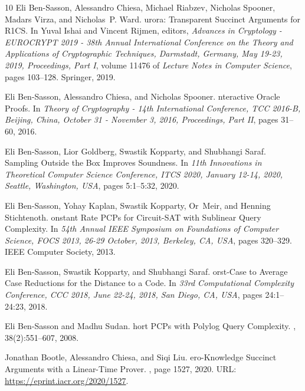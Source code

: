 \begin{thebibliography}{10}
Eli Ben{-}Sasson, Alessandro Chiesa, Michael Riabzev, Nicholas Spooner, Madars
  Virza, and Nicholas~P. Ward.
urora: {T}ransparent {S}uccinct {A}rguments for {{R}1{C}{S}}.
\newblock In Yuval Ishai and Vincent Rijmen, editors, {\em Advances in
  Cryptology - {EUROCRYPT} 2019 - 38th Annual International Conference on the
  Theory and Applications of Cryptographic Techniques, Darmstadt, Germany, May
  19-23, 2019, Proceedings, Part {I}}, volume 11476 of {\em Lecture Notes in
  Computer Science}, pages 103--128. Springer, 2019.

Eli Ben{-}Sasson, Alessandro Chiesa, and Nicholas Spooner.
nteractive {O}racle {P}roofs.
\newblock In {\em Theory of Cryptography - 14th International Conference, {TCC}
  2016-B, Beijing, China, October 31 - November 3, 2016, Proceedings, Part
  {II}}, pages 31--60, 2016.

Eli Ben{-}Sasson, Lior Goldberg, Swastik Kopparty, and Shubhangi Saraf.
 {S}ampling {O}utside the {B}ox {I}mproves
  {S}oundness.
\newblock In {\em 11th Innovations in Theoretical Computer Science Conference,
  {ITCS} 2020, January 12-14, 2020, Seattle, Washington, {USA}}, pages
  5:1--5:32, 2020.

Eli Ben{-}Sasson, Yohay Kaplan, Swastik Kopparty, Or~Meir, and Henning
  Stichtenoth.
onstant {R}ate {{P}{C}{P}}s for {C}ircuit-{S}{A}{T} with
  {S}ublinear {Q}uery {C}omplexity.
\newblock In {\em 54th Annual {IEEE} Symposium on Foundations of Computer
  Science, {FOCS} 2013, 26-29 October, 2013, Berkeley, CA, {USA}}, pages
  320--329. {IEEE} Computer Society, 2013.

Eli Ben{-}Sasson, Swastik Kopparty, and Shubhangi Saraf.
orst-{C}ase to {A}verage {C}ase {R}eductions for the {D}istance to
  a {C}ode.
\newblock In {\em 33rd Computational Complexity Conference, {CCC} 2018, June
  22-24, 2018, San Diego, CA, {USA}}, pages 24:1--24:23, 2018.

Eli Ben{-}Sasson and Madhu Sudan.
hort {{P}{C}{P}}s with {P}olylog {Q}uery {C}omplexity.
, 38(2):551--607, 2008.

Jonathan Bootle, Alessandro Chiesa, and Siqi Liu.
ero-{K}nowledge {S}uccinct {A}rguments with a {L}inear-{T}ime
  {P}rover.
, page 1527, 2020.
\newblock URL: \url{https://eprint.iacr.org/2020/1527}.


\end{thebibliography}
